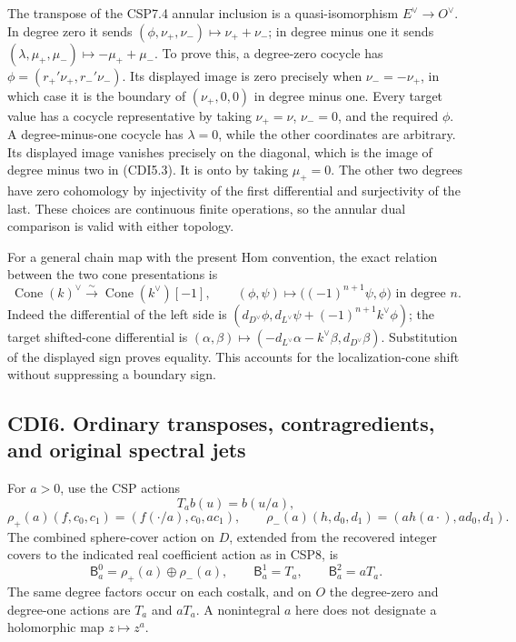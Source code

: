 The transpose of the CSP7.4 annular inclusion is a quasi-isomorphism
\(E^\vee\to O^\vee\). In degree zero it sends
\((\phi,\nu_+,\nu_-)\mapsto\nu_++\nu_-\); in degree minus one it sends
\((\lambda,\mu_+,\mu_-)\mapsto-\mu_++\mu_-\). To prove this, a
degree-zero cocycle has \(\phi=(r_+'\nu_+,r_-'\nu_-)\). Its displayed
image is zero precisely when \(\nu_-=-\nu_+\), in which case it is the
boundary of \((\nu_+,0,0)\) in degree minus one. Every target value has
a cocycle representative by taking \(\nu_+=\nu\), \(\nu_-=0\), and the
required \(\phi\). A degree-minus-one cocycle has \(\lambda=0\), while
the other coordinates are arbitrary. Its displayed image vanishes
precisely on the diagonal, which is the image of degree minus two in
(CDI5.3). It is onto by taking \(\mu_+=0\). The other two degrees have
zero cohomology by injectivity of the first differential and
surjectivity of the last. These choices are continuous finite
operations, so the annular dual comparison is valid with either
topology.

For a general chain map with the present Hom convention, the exact
relation between the two cone presentations is \[
\operatorname{Cone}(k)^\vee
\xrightarrow{\sim}\operatorname{Cone}(k^\vee)[-1],
\qquad (\phi,\psi)\longmapsto\bigl((-1)^{n+1}\psi,\phi\bigr)
\text{ in degree }n.
\tag{CDI5.4}
\] Indeed the differential of the left side is
\((d_{D^\vee}\phi,d_{L^\vee}\psi+(-1)^{n+1}k^\vee\phi)\); the target
shifted-cone differential is
\((\alpha,\beta)\mapsto(-d_{L^\vee}\alpha-k^\vee\beta,d_{D^\vee}\beta)\).
Substitution of the displayed sign proves equality. This accounts for
the localization-cone shift without suppressing a boundary sign.

\subsection{CDI6. Ordinary transposes, contragredients, and original
spectral
jets}\label{cdi6.-ordinary-transposes-contragredients-and-original-spectral-jets}

For \(a>0\), use the CSP actions \[
T_ab(u)=b(u/a),
\] \[
\rho_+(a)(f,c_0,c_1)=(f(\cdot/a),c_0,ac_1),
\qquad
\rho_-(a)(h,d_0,d_1)=(a h(a\cdot),ad_0,d_1).
\tag{CDI6.1}
\] The combined sphere-cover action on \(D\), extended from the
recovered integer covers to the indicated real coefficient action as in
CSP8, is \[
\mathsf B_a^0=\rho_+(a)\oplus\rho_-(a),\qquad
\mathsf B_a^1=T_a,\qquad \mathsf B_a^2=aT_a.
\tag{CDI6.2}
\] The same degree factors occur on each costalk, and on \(O\) the
degree-zero and degree-one actions are \(T_a\) and \(aT_a\). A
nonintegral \(a\) here does not designate a holomorphic map
\(z\mapsto z^a\).

